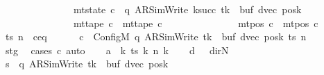 \begin{isabellebody}
\ \ \ \ \ \ \ \ \ \ \ \ \ \ {\isasymand}\ mt{\isacharunderscore}{\kern0pt}state\ c{\isacharprime}{\kern0pt}{\isacharprime}{\kern0pt}\ {\isacharequal}{\kern0pt}\ {\isacharparenleft}{\kern0pt}q{\isacharcomma}{\kern0pt}\ AR{\isacharunderscore}{\kern0pt}SimWrite{\isacharcomma}{\kern0pt}\ k{\isacharunderscore}{\kern0pt}succ\ tk{\isacharcomma}{\kern0pt}\ {}{\isacharcomma}{\kern0pt}\ buf{\isacharcomma}{\kern0pt}\ dvec{\isacharcomma}{\kern0pt}\ posk{\isacharparenright}{\kern0pt}\isanewline
\ \ \ \ \ \ \ \ \ \ \ \ \ \ {\isasymand}\ mt{\isacharunderscore}{\kern0pt}tape\ c{\isacharprime}{\kern0pt}{\isacharprime}{\kern0pt}\ {\isacharequal}{\kern0pt}\ mt{\isacharunderscore}{\kern0pt}tape\ c{\isacharprime}{\kern0pt}\isanewline
\ \ \ \ \ \ \ \ \ \ \ \ \ \ {\isasymand}\ mt{\isacharunderscore}{\kern0pt}pos\ c{\isacharprime}{\kern0pt}{\isacharprime}{\kern0pt}\ {\isacharequal}{\kern0pt}\ mt{\isacharunderscore}{\kern0pt}pos\ c{\isacharprime}{\kern0pt}{\isachardoublequoteclose}\isanewline
%
\isadelimproof
%
\endisadelimproof
%
\isatagproof
{}\isamarkupfalse%
\ {\isacharminus}{\kern0pt}\isanewline
\ \ \isamarkupfalse%
\ ts\ n\ \ c{\isacharprime}{\kern0pt}{\isacharunderscore}{\kern0pt}eq{\isacharcolon}{\kern0pt}\isanewline
\ \ \ \ \ \ {\isachardoublequoteopen}c{\isacharprime}{\kern0pt}\ {\isacharequal}{\kern0pt}\ Config\isactrlsub M\ {\isacharparenleft}{\kern0pt}q{\isacharcomma}{\kern0pt}\ AR{\isacharunderscore}{\kern0pt}SimWrite{\isacharcomma}{\kern0pt}\ tk{\isacharcomma}{\kern0pt}\ {}{\isacharcomma}{\kern0pt}\ buf{\isacharcomma}{\kern0pt}\ dvec{\isacharcomma}{\kern0pt}\ posk{\isacharparenright}{\kern0pt}\ ts\ n{\isachardoublequoteclose}\isanewline
\ \ \ \ \isamarkupfalse%
\ stg\ \isamarkupfalse%
\ {\isacharparenleft}{\kern0pt}cases\ c{\isacharprime}{\kern0pt}{\isacharparenright}{\kern0pt}\ auto\isanewline
\ \ \isamarkupfalse%
\ {\isacharquery}{\kern0pt}a\ {\isacharequal}{\kern0pt}\ {\isachardoublequoteopen}{\isasymlambda}k{\isachardot}{\kern0pt}\ ts\ k\ {\isacharparenleft}{\kern0pt}n\ k{\isacharparenright}{\kern0pt}{\isachardoublequoteclose}\isanewline
\ \ \isamarkupfalse%
\ {\isacharquery}{\kern0pt}d\ {\isacharequal}{\kern0pt}\ {\isachardoublequoteopen}{\isasymlambda}{\isacharunderscore}{\kern0pt}{\isachardot}{\kern0pt}\ dir{\isachardot}{\kern0pt}N{\isachardoublequoteclose}\isanewline
\ \ \isamarkupfalse%
\ {\isacharquery}{\kern0pt}s\ {\isacharequal}{\kern0pt}\ {\isachardoublequoteopen}{\isacharparenleft}{\kern0pt}q{\isacharcomma}{\kern0pt}\ AR{\isacharunderscore}{\kern0pt}SimWrite{\isacharcomma}{\kern0pt}\ tk{\isacharcomma}{\kern0pt}\ {}{\isacharcomma}{\kern0pt}\ buf{\isacharcomma}{\kern0pt}\ dvec{\isacharcomma}{\kern0pt}\ posk{\isacharparenright}{\kern0pt}{\isachardoublequoteclose}\isanewline

\end{isabellebody}

